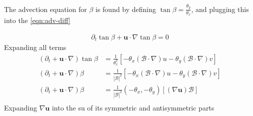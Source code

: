 The advection equation for $\beta$ is found by defining $\tan \beta = \frac{\theta_{y}}{\theta_{x}}$, and plugging this into the \ref{eqn:adv-diff}

\begin{align*}
 \partial_{t} \tan \beta + \mathbf{u} \cdot \nabla \tan \beta = 0
\end{align*}
Expanding all terms
\begin{align*}
 \left(\partial_{t} + \mathbf{u} \cdot \nabla \right) \tan \beta &= \frac{1}{\theta^{2}_{x}} \left[ -\theta_{x} \left(\mathcal{B} \cdot \nabla \right)u - \theta_{y} \left(\mathcal{B} \cdot \nabla \right)v \right] \\
 \left(\partial_{t} + \mathbf{u} \cdot \nabla \right) \beta &= \frac{1}{|\mathcal{B}|^{2}} \left[ -\theta_{x} \left(\mathcal{B} \cdot \nabla \right)u - \theta_{y} \left(\mathcal{B} \cdot \nabla \right)v \right] \\
 \left(\partial_{t} + \mathbf{u} \cdot \nabla \right) \beta &= \frac{1}{|\mathcal{B}|^{2}} \left( -\theta_{x}, -\theta_{y} \right) \left[\left( \nabla \mathbf{u}  \right)\mathcal{B} \right] \\
\end{align*}
Expanding $\nabla \mathbf{u}$ into the su of its symmetric and antisymmetric parts \\
